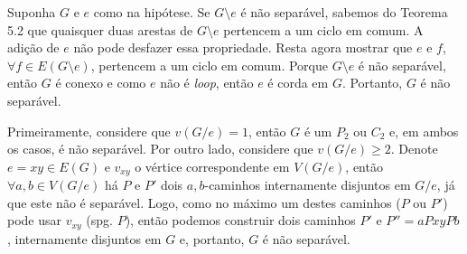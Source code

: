 
 Suponha $G$ e $e$ como na hipótese. Se $G\setminus e$ é não
separável, sabemos do Teorema 5.2 que quaisquer duas arestas de $G\setminus e$
pertencem a um ciclo em comum. A adição de $e$ não pode desfazer essa
propriedade. Resta agora mostrar que $e$ e $f$, $\forall f \in E(G\setminus
e)$, pertencem a um ciclo em comum.  Porque $G\setminus e$ é não separável,
então $G$ é conexo e como $e$ não é \emph{loop}, então $e$ é corda em $G$.
Portanto, $G$ é não separável.
\fimprova

 Primeiramente, considere que $v(G/e) = 1$, então  $G$ é um $P_2$
ou $C_2$ e, em ambos os casos, é não separável. Por outro lado, considere que
$v(G/e) \ge 2$. Denote $e = xy \in E(G)$ e $v_{xy}$ o vértice correspondente
em $V(G/e)$, então $\forall a,b \in V(G/e)$ há $P$ e $P'$ dois $a,b$-caminhos
internamente disjuntos em $G/e$, já que este não é separável. Logo, como no 
máximo um destes caminhos ($P$ ou $P'$) pode usar $v_{xy}$ (spg. $P$), então
podemos construir dois caminhos $P'$ e $P'' = aPxyPb$, internamente disjuntos
em $G$ e, portanto, $G$ é não separável.
\fimprova
